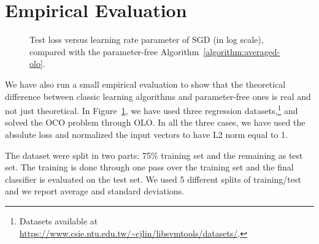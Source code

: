\section{Empirical Evaluation}

\begin{figure}[t]
\centering
{}
\caption{\footnotesize{Test loss versus learning rate parameter of \ac{SGD} (in log scale), compared with the parameter-free Algorithm~\ref{algorithm:averaged-olo}.}}
\label{figure:experiments-olo}
\end{figure}

We have also run a small empirical evaluation to show that the theoretical
difference between classic learning algorithms and parameter-free ones is real
and not just theoretical. In Figure~\ref{figure:experiments-olo}, we have used
three regression datasets,\footnote{Datasets available at
\url{https://www.csie.ntu.edu.tw/~cjlin/libsvmtools/datasets/}.} and solved
the \ac{OCO} problem through \ac{OLO}. In all the three cases, we have used the
absolute loss and normalized the input vectors to have L2 norm equal to 1. 

The dataset were split in two parts: 75\% training set and the remaining as test set. The training is done through one pass over the training set and the final classifier is evaluated on the test set. We used 5 different splits of training/test and we report average and standard deviations. 

